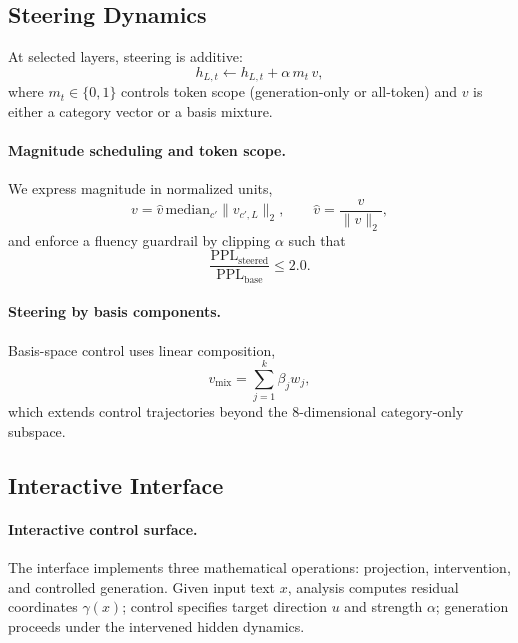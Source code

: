 \subsection{Steering Dynamics}
\label{sec:dev:steering:hook}
At selected layers, steering is additive:
\begin{equation}
  h_{L,t} \leftarrow h_{L,t} + \alpha\,m_t\,v,
\end{equation}
where $m_t\in\{0,1\}$ controls token scope (generation-only or all-token)
and $v$ is either a category vector or a basis mixture.

\paragraph{Magnitude scheduling and token scope.}
\label{sec:dev:steering:schedule}
We express magnitude in normalized units,
\begin{equation}
  v=\hat{v}\,\mathrm{median}_{c'}\|v_{c',L}\|_2,
  \qquad \hat{v}=\frac{v}{\|v\|_2},
\end{equation}
and enforce a fluency guardrail by clipping $\alpha$ such that
\begin{equation}
  \frac{\mathrm{PPL}_{\text{steered}}}{\mathrm{PPL}_{\text{base}}}\leq 2.0.
\end{equation}

\paragraph{Steering by basis components.}
\label{sec:dev:steering:basis}
Basis-space control uses linear composition,
\begin{equation}
  v_{\text{mix}}=\sum_{j=1}^{k}\beta_j w_j,
\end{equation}
which extends control trajectories beyond the
8-dimensional category-only subspace.

\subsection{Interactive Interface}
\label{sec:dev:serving}

\paragraph{Interactive control surface.}
\label{sec:dev:serving:api}
The interface implements three mathematical operations: projection,
intervention, and controlled generation. Given input text $x$, analysis
computes residual coordinates $\gamma(x)$; control specifies target
direction $u$ and strength $\alpha$; generation proceeds under the
intervened hidden dynamics.

